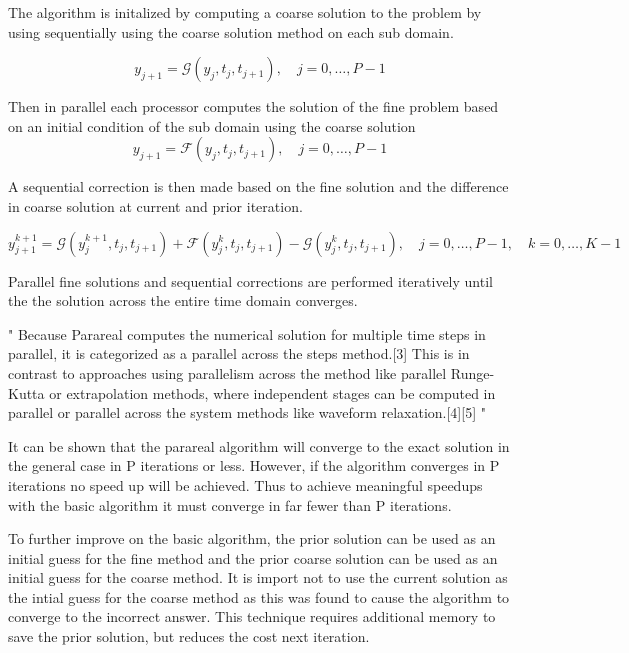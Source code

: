 \documentclass[conf]{new-aiaa}
\begin{document}
The algorithm is initalized by computing a coarse solution to the problem by using sequentially using the coarse solution method on each sub domain.

\begin{equation}
    y_{j+1}=\mathcal{G}\left(y_{j}, t_{j}, t_{j+1}\right), \quad j=0, \ldots, P-1
\end{equation}


Then in parallel each processor computes the solution of the fine problem based on an initial condition of the sub domain using the coarse solution
\begin{equation}
    y_{j+1}=\mathcal{F}\left(y_{j}, t_{j}, t_{j+1}\right), \quad j=0, \ldots, P-1
\end{equation}


A sequential correction is then made based on the fine solution and the difference in coarse solution at current and prior iteration.


\begin{equation}
    y_{j+1}^{k+1}=\mathcal{G}\left(y_{j}^{k+1}, t_{j}, t_{j+1}\right)+\mathcal{F}\left(y_{j}^{k}, t_{j}, t_{j+1}\right)-\mathcal{G}\left(y_{j}^{k}, t_{j}, t_{j+1}\right), \quad j=0, \ldots, P-1, \quad k=0, \ldots, K-1
\end{equation}

Parallel fine solutions and sequential corrections are performed iteratively until the the solution across the entire time domain converges.

"
Because Parareal computes the numerical solution for multiple time steps in parallel, it is categorized as a parallel across the steps method.[3] This is in contrast to approaches using parallelism across the method like parallel Runge-Kutta or extrapolation methods, where independent stages can be computed in parallel or parallel across the system methods like waveform relaxation.[4][5]
"


It can be shown that the parareal algorithm will converge to the exact solution in the general case in P iterations or less.
However, if the algorithm converges in P iterations no speed up will be achieved.
Thus to achieve meaningful speedups with the basic algorithm it must converge in far fewer than P iterations.



To further improve on the basic algorithm, the prior solution can be used as an initial guess for the fine method and the prior coarse solution can be used as an initial guess for the coarse method.
It is import not to use the current solution as the intial guess for the coarse method as this was found to cause the algorithm to converge to the incorrect answer.
This technique requires additional memory to save the prior solution, but reduces the cost next iteration.
\end{document}
